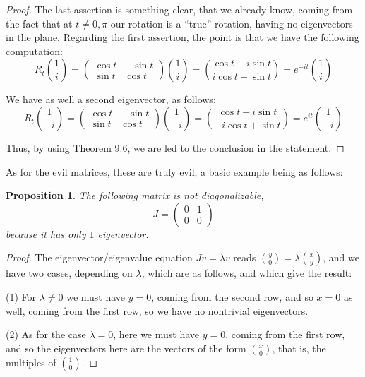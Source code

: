 \documentclass[12pt]{amsbook}
\newtheorem{proposition}[theorem]{Proposition}
\begin{document}
\begin{proof}
The last assertion is something clear, that we already know, coming from the fact that at $t\neq0,\pi$ our rotation is a ``true'' rotation, having no eigenvectors in the plane. Regarding the first assertion, the point is that we have the following computation:
$$R_t\binom{1}{i}
=\begin{pmatrix}\cos t&-\sin t\\ \sin t&\cos t\end{pmatrix}\binom{1}{i}
=\binom{\cos t-i\sin t}{i\cos t+\sin t}
=e^{-it}\binom{1}{i}$$

We have as well a second eigenvector, as follows:
$$R_t\binom{1}{-i}
=\begin{pmatrix}\cos t&-\sin t\\ \sin t&\cos t\end{pmatrix}\binom{1}{-i}
=\binom{\cos t+i\sin t}{-i\cos t+\sin t}
=e^{it}\binom{1}{-i}$$

Thus, by using Theorem 9.6, we are led to the conclusion in the statement.
\end{proof}

As for the evil matrices, these are truly evil, a basic example being as follows:


\begin{proposition}
The following matrix is not diagonalizable,
$$J=\begin{pmatrix}0&1\\0&0\end{pmatrix}$$
because it has only $1$ eigenvector.
\end{proposition}

\begin{proof}
The eigenvector/eigenvalue equation $Jv=\lambda v$ reads $\binom{y}{0}=\lambda\binom{x}{y}$, and we have two cases, depending on $\lambda$, which are as follows, and which give the result:

\medskip

(1) For $\lambda\neq0$ we must have $y=0$, coming from the second row, and so $x=0$ as well, coming from the first row, so we have no nontrivial eigenvectors. 

\medskip

(2) As for the case $\lambda=0$, here we must have $y=0$, coming from the first row, and so the eigenvectors here are the vectors of the form $\binom{x}{0}$, that is, the multiples of $\binom{1}{0}$. 
\end{proof}
\end{document}

